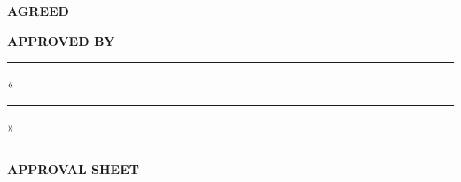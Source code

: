 \begin{center}
\begin{minipage}[t]{0.42\textwidth}
\textbf{AGREED}

\small
\scientificadvisorrole

\vspace{0.15cm}

\supervisorsignatureline{6cm}

\scientificadvisorname

\vspace{0.1cm}

\signdateblank
\ifhseHasCoSupervisor

\vspace{0.25cm}

\coscientificadvisorrole

\vspace{0.15cm}

\cosupervisorsignatureline{6cm}

\coscientificadvisorname

\vspace{0.1cm}

\signdateblank
\fi
\end{minipage}
\hspace{0.5cm}
\begin{minipage}[t]{0.42\textwidth}
\textbf{APPROVED BY}

\small
\academicsupervisorrole

\vspace{0.3cm}

\rule{6cm}{0.4pt}

\academicsupervisorname

\vspace{0.1cm}

«\rule{1cm}{0.4pt}» \rule{3cm}{0.4pt} \yearval
\end{minipage}
\end{center}

\vspace{0.6cm}

\begin{center}
\textbf{\LARGE \projectname}

\vspace{0.3cm}

\textbf{\docname}

\vspace{0.1cm}

\textbf{APPROVAL SHEET}

\vspace{0.1cm}

\textbf{\doccodelu}
\end{center}

